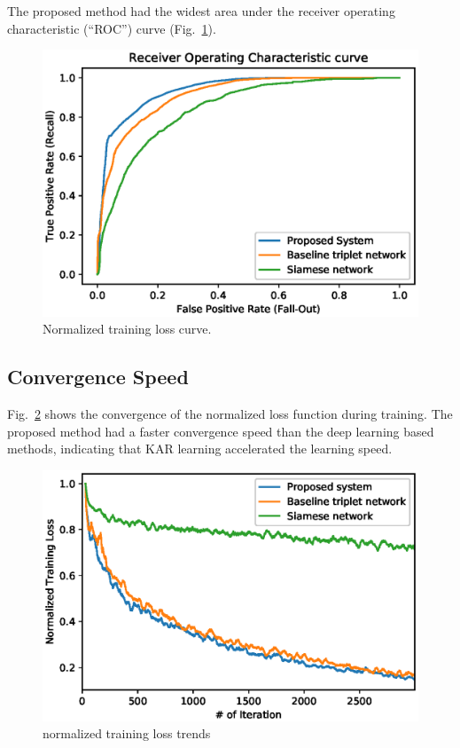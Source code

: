 The proposed method had the widest area under the receiver operating characteristic (``ROC'') curve (Fig.~\ref{fig_roc}).
\begin{figure}[!ht]
    \includegraphics[width=\textwidth]{fig_roc_v15.eps}
    \caption{Normalized training loss curve.} \label{fig_roc}
\end{figure}
\subsection{Convergence Speed}
Fig.~\ref{fig_loss} shows the convergence of the normalized loss function during training. The proposed method had a faster convergence speed than the deep learning based methods, indicating that KAR learning accelerated the learning speed.
 \begin{figure}[!ht]
    \includegraphics[width=\textwidth]{normalized_loss_curve_ma30_v3.eps}
    \caption{normalized training loss trends} \label{fig_loss}
\end{figure}
